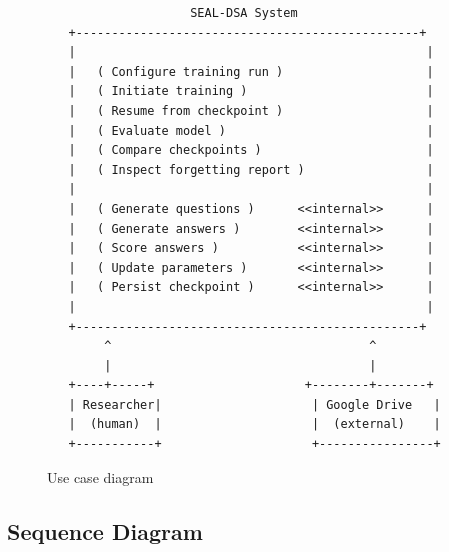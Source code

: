 \documentclass[12pt,a4paper]{report}
\begin{document}
\begin{figure}[htbp]
\centering
\begin{verbatim}
                    SEAL-DSA System
   +------------------------------------------------+
   |                                                 |
   |   ( Configure training run )                    |
   |   ( Initiate training )                         |
   |   ( Resume from checkpoint )                    |
   |   ( Evaluate model )                            |
   |   ( Compare checkpoints )                       |
   |   ( Inspect forgetting report )                 |
   |                                                 |
   |   ( Generate questions )      <<internal>>      |
   |   ( Generate answers )        <<internal>>      |
   |   ( Score answers )           <<internal>>      |
   |   ( Update parameters )       <<internal>>      |
   |   ( Persist checkpoint )      <<internal>>      |
   |                                                 |
   +------------------------------------------------+
        ^                                    ^
        |                                    |
   +----+-----+                     +--------+-------+
   | Researcher|                     | Google Drive   |
   |  (human)  |                     |  (external)    |
   +-----------+                     +----------------+
\end{verbatim}
\caption{Use case diagram}
\end{figure}

\subsection{Sequence Diagram}
\end{document}
